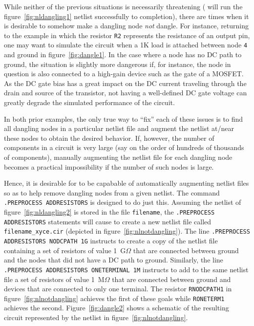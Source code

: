 While neither of the previous situations is necessarily threatening (\Xyce{}
will run the figure\ \ref{fig:nldangling1} netlist successfully to completion),
there are times when it is desirable to somehow make a dangling node {\em not}
dangle.  For instance, returning to the example in which the resistor
\texttt{R2} represents the resistance of an output pin, one may want to
simulate the circuit when a 1K load is attached between node \texttt{4} and
ground in figure\ \ref{fig:dangle1}.  In the case where a node has no DC path
to ground, the situation is slightly more dangerous if, for instance, the node
in question is also connected to a high-gain device such as the gate of a
MOSFET.  As the DC gate bias has a great impact on the DC current traveling
through the drain and source of the transistor, not having a well-defined DC
gate voltage can greatly degrade the simulated performance of the circuit.

In both prior examples, the only true way to ``fix'' each of these issues is to
find all dangling nodes in a particular netlist file and augment the netlist
at/near these nodes to obtain the desired behavior.  If, however, the number of
components in a circuit is very large (say on the order of hundreds of
thousands of components), manually augmenting the netlist file for each
dangling node becomes a practical impossibility if the number of such nodes is
large.  

Hence, it is desirable for \Xyce{} to be capabable of automatically augmenting
netlist files so as to help remove dangling nodes from a given netlist.  The
command \texttt{.PREPROCESS ADDRESISTORS} is designed to do just this. Assuming
the netlist of figure\ \ref{fig:nldangling2} is stored in the file
\texttt{filename}, the \texttt{.PREPROCESS ADDRESISTORS} statements will cause
\Xyce{} to create a new netlist file called \texttt{filename\_xyce.cir}
(depicted in figure\ \ref{fig:nlnotdangling}).  The line \texttt{.PREPROCESS
ADDRESISTORS NODCPATH 1G} instructs \Xyce{} to create a copy of the netlist
file containing a set of resistors of value 1~G$\mathsf{\Omega}$ that are
connected between ground and the nodes that did not have a DC path to ground.
Similarly, the line \texttt{.PREPROCESS ADDRESISTORS ONETERMINAL 1M} instructs
\Xyce{} to add to the same netlist file a set of resistors of value
1~M$\mathsf{\Omega}$ that are connected between ground and devices that are
connected to only one terminal.  The resistor \texttt{RNODCPATH1} in figure\
\ref{fig:nlnotdangling} achieves the first of these goals while
\texttt{RONETERM1} achieves the second.  Figure\ \ref{fig:dangle2} shows a
schematic of the resulting circuit represented by the netlist in figure\
\ref{fig:nlnotdangling}.

